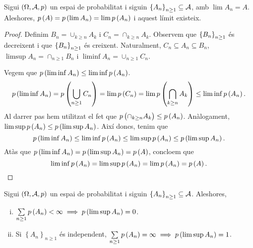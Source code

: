 \begin{prop}
    Sigui $\left(\Omega,\mathcal{A},p\right)$ un espai de probabilitat i siguin $\left\{ A_n\right\}_{n\geq1} \subseteq \mathcal{A}$, amb $\lim A_n=A$. Aleshores, $p\left( A\right) = p\left( \lim A_n\right) = \lim p \left( A_n\right)$ i aquest límit existeix.
\end{prop}
\begin{proof}
    Definim $B_n=\cup_{k\geq n}A_k$ i $C_n=\cap_{k\geq n}A_k$. Observem que $\left\{ B_n\right\}_{n\geq 1}$ és decreixent i que $\left\{ B_n\right\}_{n\geq 1}$ és creixent. Naturalment, $C_n\subseteq A_n\subseteq B_n$, $\limsup A_n = \cap_{n\geq 1} B_n$ i $\liminf A_n = \cup_{n\geq 1} C_n$.
    
    \noindent Vegem que $p\left(\liminf A_n\right)\leq\liminf p\left( A_n\right)$.
    \[
        p\left(\liminf A_n\right)=p\left(\bigcup_{n\geq 1} C_n\right) = \lim p\left( C_n\right)=\lim p\left( \bigcap_{k\geq n} A_k\right)\leq\liminf p\left( A_n\right).
    \]
    Al darrer pas hem utilitzat el fet que $p\left( \cap_{k\geq n} A_k\right)\leq p\left( A_n\right)$. Anàlogament, $\limsup p\left( A_n\right)\leq p\left(\limsup A_n\right)$. Així doncs, tenim que
    \[
        p\left(\liminf A_n\right)\leq\liminf p\left( A_n\right)\leq\limsup p\left( A_n\right)\leq p\left(\limsup A_n\right).
    \]
    Atàs que $p\left(\liminf A_n\right)=p\left(\limsup A_n\right)=p\left( A\right)$, concloem que 
    \[
        \liminf p\left( A_n\right)=\limsup p\left( A_n\right)=\lim p\left( A_n\right)=p\left( A\right).
    \]
\end{proof}
\begin{teo}
    Sigui $\left(\Omega,\mathcal{A},p\right)$ un espai de probabilitat i siguin $\left\{ A_n\right\}_{n\geq1} \subseteq \mathcal{A}$. Aleshores,
    \begin{enumerate}[i)]
        \item $\sum\limits_{n\geq 1} p\left( A_n\right)<\infty\implies p\left(\limsup A_n\right)=0$.
        \item Si $\left\{ A_n\right\}_{n\geq1}$ és independent, $\sum\limits_{n\geq 1} p\left( A_n\right)=\infty\implies p\left(\limsup A_n\right)=1$.
    \end{enumerate}
\end{teo}
